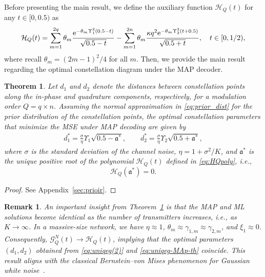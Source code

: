 \documentclass[journal,12pt,onecolumn,draftclsnofoot]{IEEEtran}
\newtheorem{theorem}{Theorem}
\newtheorem{remark}{Remark}
\theoremstyle{definition}
\begin{document}
Before presenting the main result, we define the auxiliary function $\mathcal{H}_Q(t)$ for any  $t \in [0, 0.5)$ as
\begin{align}
    \label{eq:HQpoly}
    \mathcal{H}_Q(t) =  \sum_{m=1}^{2q}{\theta}_{m} \frac{{\rm e}^{-\theta_{m}  \Upsilon_1^2(0.5-t)}}{\sqrt{0.5-t}} -\sum_{m=1}^{2n}{\theta}_{m}\frac{\kappa q^2{\rm e}^{-\theta_{m} \Upsilon_2^2 (t+0.5)}}{\sqrt{0.5+t}},\quad  t\in [0,1/2),
\end{align}
where recall $\theta_m =(2m-1)^2/4$ for all $m$. Then, we provide the main result regarding the optimal constellation diagram under the MAP decoder.
\begin{theorem}\label{th:Optmizaiton-Map}
Let $d_1$ and $d_2$ denote the distances between constellation points along the in-phase and quadrature components, respectively, for a modulation order $Q = q \times n$.  
Assuming the normal approximation in \eqref{eq:prior_dist} for the prior distribution of the constellation points, the optimal constellation parameters that minimize the MSE under MAP decoding are given by
\begin{align}
\label{eq:uniqeg-MAp-th}
{d}_1^* =  \frac{\sigma}{\eta} \Upsilon_1 \sqrt{0.5 - \mathfrak{a}^*}, 
\qquad 
{d}_2^* = \frac{\sigma}{\eta} \Upsilon_2 \sqrt{0.5 + \mathfrak{a}^*},
\end{align}
where $\sigma$ is the standard deviation of the channel noise, $\eta = 1 + \sigma^2/K$,  and $\mathfrak{a}^*$ is the unique positive root of the polynomial $\mathcal{H}_Q(t)$ defined in \eqref{eq:HQpoly}, i.e.,
\[
\mathcal{H}_Q(\mathfrak{a}^*) = 0.
\]
\end{theorem}
\begin{proof}
    See Appendix~\ref{sec:prioir}.
\end{proof}

\begin{remark}
An important insight from Theorem~\ref{th:Optmizaiton-Map} is that the MAP and ML solutions become identical as the number of transmitters increases, i.e., as \(K \to \infty\).  
In a massive-size network, we have \(\eta \approx 1\), \(\theta_m \approx \gamma_{1,m} \approx \gamma_{2,m}\), and \(\xi_1 \approx 0\).  
Consequently, \(\mathcal{G}_Q^N(t) \rightarrow \mathcal{H}_Q(t)\), implying that the optimal parameters \((d_1, d_2)\) obtained from \eqref{eq:uniqeg(2)} and \eqref{eq:uniqeg-MAp-th} coincide.   This result aligns with the classical Bernstein--von Mises phenomenon for Gaussian white noise~\cite{Haralambie2011Bernstein}.
\end{remark}
\end{document}
